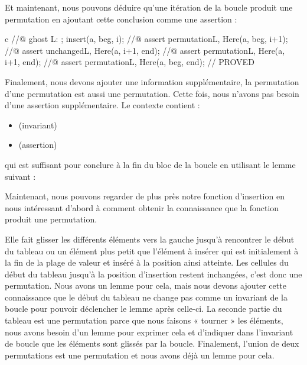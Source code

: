 

Et maintenant, nous pouvons déduire qu'une itération de la boucle produit
une permutation en ajoutant cette conclusion comme une assertion :


\begin{CodeBlock}{c}
    //@ ghost L: ;
    insert(a, beg, i);
    //@ assert permutation{L, Here}(a, beg, i+1);
    //@ assert unchanged{L, Here}(a, i+1, end);
    //@ assert permutation{L, Here}(a, i+1, end);
    //@ assert permutation{L, Here}(a, beg, end); // PROVED
\end{CodeBlock}


Finalement, nous devons ajouter une information supplémentaire, la permutation
d'une permutation est aussi une permutation. Cette fois, nous n'avons pas
besoin d'une assertion supplémentaire. Le contexte contient :
\begin{itemize}
\item {} (invariant)
\item {} (assertion)
\end{itemize}
qui est suffisant pour conclure 
à la fin du bloc de la boucle en utilisant le lemme suivant :




Maintenant, nous pouvons regarder de plus près notre fonction d'insertion en
nous intéressant d'abord à comment obtenir la connaissance que la fonction
produit une permutation.


Elle fait glisser les différents éléments vers la gauche jusqu'à rencontrer le
début du tableau ou un élément plus petit que l'élément à insérer qui est
initialement à la fin de la plage de valeur et inséré à la position ainsi atteinte.
Les cellules du début du tableau jusqu'à la position d'insertion restent
inchangées, c'est donc une permutation. Nous avons un lemme pour cela, mais nous
devons ajouter cette connaissance que le début du tableau ne change pas comme
un invariant de la boucle pour pouvoir déclencher le lemme après celle-ci. La
seconde partie du tableau est une permutation parce que nous faisons « tourner »
les éléments, nous avons besoin d'un lemme pour exprimer cela et d'indiquer dans
l'invariant de boucle que les éléments sont glissés par la boucle. Finalement,
l'union de deux permutations est une permutation et nous avons déjà un lemme
pour cela.


